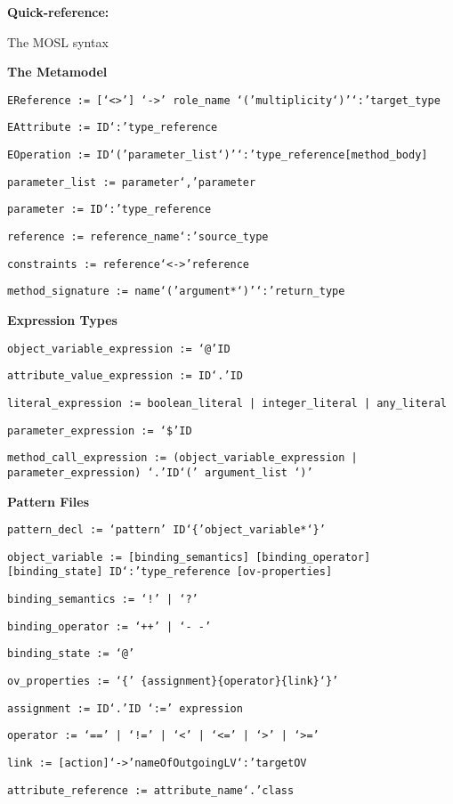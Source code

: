 \newpage
{}
{}
\hypertarget{quickRef}{}

\vspace{1cm}
{\Huge \bf Quick-reference:}

{\huge \hspace{3cm} The MOSL syntax}
\vspace{1cm}


{\bf The Metamodel}

\texttt{EReference := [`<>'] `->' role\_name `('multiplicity`)'`:'target\_type}

\texttt{EAttribute := ID`:'type\_reference}

\texttt{EOperation := ID`('parameter\_list`)'`:'type\_reference[method\_body]}

\texttt{parameter\_list := parameter`,'parameter}

\texttt{parameter := ID`:'type\_reference}

\texttt{reference := reference\_name`:'source\_type}

\texttt{constraints := reference`<->'reference}

\texttt{method\_signature := name`('argument*`)'`:'return\_type}

\vspace{1cm}



{\bf Expression Types}

\texttt{object\_variable\_expression := `@'ID}

\texttt{attribute\_value\_expression := ID`.'ID}

\texttt{literal\_expression := boolean\_literal | integer\_literal | any\_literal}

\texttt{parameter\_expression := `\$'ID}

\texttt{method\_call\_expression := (object\_variable\_expression | parameter\_expression) `.'ID`(' argument\_list `)'}

\vspace{1cm}

{\bf Pattern Files}

\texttt{pattern\_decl := `pattern' ID`\{'object\_variable*`\}' }

\texttt{object\_variable := [binding\_semantics] [binding\_operator] [binding\_state] ID`:'type\_reference [ov-properties]}

\texttt{binding\_semantics := `!' | `?'}

\texttt{binding\_operator := `++' | `-~-'}

\texttt{binding\_state := `@'}

\texttt{ov\_properties := `\{' \{assignment\}\{operator\}\{link\}`\}' }

\texttt{assignment := ID`.'ID `:=' expression}

\texttt{operator := `==' | `!=' | `<' | `<=' | `>' | `>='}

\texttt{link := [action]`->'nameOfOutgoingLV`:'targetOV}

\texttt{attribute\_reference := attribute\_name`.'class}

